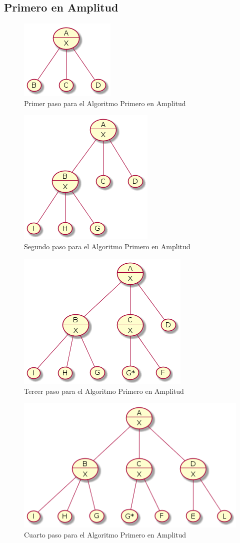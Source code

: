 \documentclass{article}
\begin{document}
\subsection{Primero en Amplitud}

\begin{figure}[H]
  \centering
  \includegraphics[width=.4\linewidth]{EJ4/ej4.png}
  \caption{Primer paso para el Algoritmo Primero en Amplitud}
  \label{gr:g14}
\end{figure}

\begin{figure}[H]
  \centering
  \includegraphics[width=.4\linewidth]{EJ4/ej4_001.png}
  \caption{Segundo paso para el Algoritmo Primero en Amplitud}
  \label{gr:g15}
\end{figure}

\begin{figure}[H]
  \centering
  \includegraphics[width=.4\linewidth]{EJ4/ej4_002.png}
  \caption{Tercer paso para el Algoritmo Primero en Amplitud}
  \label{gr:g16}
\end{figure}

\begin{figure}[H]
  \centering
  \includegraphics[width=.4\linewidth]{EJ4/ej4_003.png}
  \caption{Cuarto paso para el Algoritmo Primero en Amplitud}
  \label{gr:g17}
\end{figure}
\end{document}
